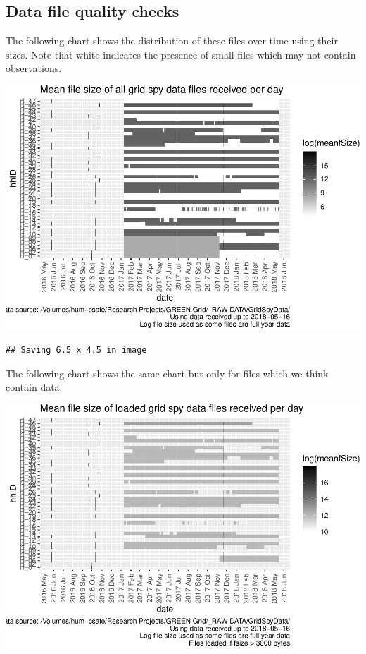 \documentclass[]{article}
\begin{document}
\subsection{Data file quality checks}\label{data-file-quality-checks}

The following chart shows the distribution of these files over time
using their sizes. Note that white indicates the presence of small files
which may not contain observations.

\includegraphics{processNZGGElecCons1minData_v2_files/figure-latex/allFileSizesPlot-1.pdf}

\begin{verbatim}
## Saving 6.5 x 4.5 in image
\end{verbatim}

The following chart shows the same chart but only for files which we
think contain data.

\includegraphics{processNZGGElecCons1minData_v2_files/figure-latex/loadedFileSizesPlot-1.pdf}
\end{document}
